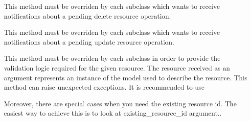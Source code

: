 \documentclass[letterpaper,10pt,english]{sphinxmanual}
\begin{document}
\begin{fulllineitems}
\begin{fulllineitems}
\end{fulllineitems}


\begin{fulllineitems}
\label{features/roa/technical_summary:fantastico.roa.resource_validator.ResourceValidator.on_pre_delete}
This method must be overriden by each subclass which wants to receive notifications about a pending
delete resource operation.

\end{fulllineitems}


\begin{fulllineitems}
\label{features/roa/technical_summary:fantastico.roa.resource_validator.ResourceValidator.on_pre_update}
This method must be overriden by each subclass which wants to receive notifications about a pending
update resource operation.

\end{fulllineitems}


\begin{fulllineitems}
\label{features/roa/technical_summary:fantastico.roa.resource_validator.ResourceValidator.validate}
This method must be overriden by each subclass in order to provide the validation logic required for the given
resource. The resource received as an argument represents an instance of the model used to describe the resource.
This method can raise unexpected exceptions. It is recommended to use
{\hyperref[features/roa/technical_summary:fantastico.roa.roa_exceptions.FantasticoRoaError]{}}

Moreover, there are special cases when you need the existing resource id. The easiest way to achieve this is to look at
existing\_resource\_id argument..

\end{fulllineitems}


\end{fulllineitems}
\end{document}
